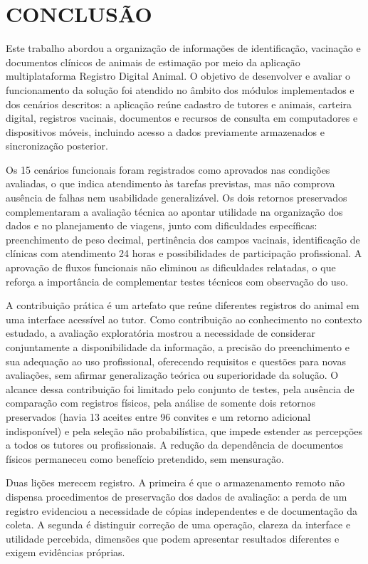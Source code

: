 \documentclass{UNESC}
\begin{document}
\section{CONCLUSÃO}

Este trabalho abordou a organização de informações de identificação, vacinação e documentos clínicos de animais de estimação por meio da aplicação multiplataforma Registro Digital Animal. O objetivo de desenvolver e avaliar o funcionamento da solução foi atendido no âmbito dos módulos implementados e dos cenários descritos: a aplicação reúne cadastro de tutores e animais, carteira digital, registros vacinais, documentos e recursos de consulta em computadores e dispositivos móveis, incluindo acesso a dados previamente armazenados e sincronização posterior.

Os 15 cenários funcionais foram registrados como aprovados nas condições avaliadas, o que indica atendimento às tarefas previstas, mas não comprova ausência de falhas nem usabilidade generalizável. Os dois retornos preservados complementaram a avaliação técnica ao apontar utilidade na organização dos dados e no planejamento de viagens, junto com dificuldades específicas: preenchimento de peso decimal, pertinência dos campos vacinais, identificação de clínicas com atendimento 24 horas e possibilidades de participação profissional. A aprovação de fluxos funcionais não eliminou as dificuldades relatadas, o que reforça a importância de complementar testes técnicos com observação do uso.

A contribuição prática é um artefato que reúne diferentes registros do animal em uma interface acessível ao tutor. Como contribuição ao conhecimento no contexto estudado, a avaliação exploratória mostrou a necessidade de considerar conjuntamente a disponibilidade da informação, a precisão do preenchimento e sua adequação ao uso profissional, oferecendo requisitos e questões para novas avaliações, sem afirmar generalização teórica ou superioridade da solução. O alcance dessa contribuição foi limitado pelo conjunto de testes, pela ausência de comparação com registros físicos, pela análise de somente dois retornos preservados (havia 13 aceites entre 96 convites e um retorno adicional indisponível) e pela seleção não probabilística, que impede estender as percepções a todos os tutores ou profissionais. A redução da dependência de documentos físicos permaneceu como benefício pretendido, sem mensuração.

Duas lições merecem registro. A primeira é que o armazenamento remoto não dispensa procedimentos de preservação dos dados de avaliação: a perda de um registro evidenciou a necessidade de cópias independentes e de documentação da coleta. A segunda é distinguir correção de uma operação, clareza da interface e utilidade percebida, dimensões que podem apresentar resultados diferentes e exigem evidências próprias.
\end{document}
